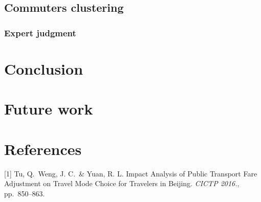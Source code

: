 \documentclass{article}
\begin{document}
\subsection{Commuters clustering}
\subsubsection{Expert judgment}

\section{Conclusion}

\section{Future work}

\section*{References}

\small

[1] Tu, Q.\ Weng, J. C.\ \& Yuan, R. L. Impact Analysis of Public Transport Fare Adjustment on Travel Mode Choice for Travelers in Beijing. {\it CICTP 2016.}, pp.\ 850--863.
\end{document}
